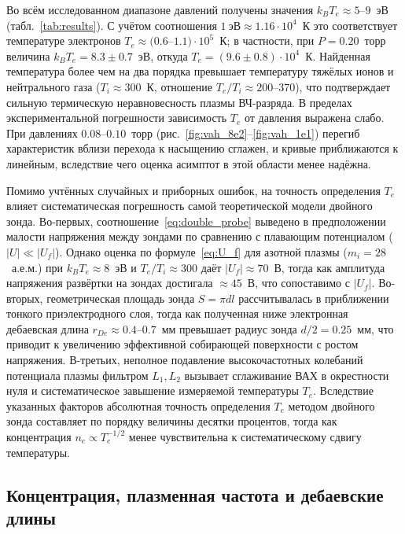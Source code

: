 \documentclass[reprint, amsmath, amssymb, aps, pra, nofootinbib]{revtex4-2}
\begin{document}
Во всём исследованном диапазоне давлений получены значения $k_B T_e \approx 5$--$9$~эВ (табл.~\ref{tab:results}). С учётом соотношения $1~\text{эВ} \approx 1.16\cdot10^4$~К это соответствует температуре электронов $T_e \approx (0.6$--$1.1)\cdot10^5$~К; в частности, при $P = 0.20$~торр величина $k_B T_e = 8.3 \pm 0.7$~эВ, откуда $T_e = (9.6 \pm 0.8)\cdot10^4$~К. Найденная температура более чем на два порядка превышает температуру тяжёлых ионов и нейтрального газа ($T_i \approx 300$~К, отношение $T_e/T_i \approx 200$--$370$), что подтверждает сильную термическую неравновесность плазмы ВЧ-разряда. В пределах экспериментальной погрешности зависимость $T_e$ от давления выражена слабо. При давлениях $0.08$--$0.10$~торр (рис.~\ref{fig:vah_8e2}--\ref{fig:vah_1e1}) перегиб характеристик вблизи перехода к насыщению сглажен, и кривые приближаются к линейным, вследствие чего оценка асимптот в этой области менее надёжна.

Помимо учтённых случайных и приборных ошибок, на точность определения $T_e$ влияет систематическая погрешность самой теоретической модели двойного зонда. Во-первых, соотношение~\eqref{eq:double_probe} выведено в предположении малости напряжения между зондами по сравнению с плавающим потенциалом ($|U| \ll |U_f|$). Однако оценка по формуле~\eqref{eq:U_f} для азотной плазмы ($m_i = 28$~а.е.м.) при $k_B T_e \approx 8$~эВ и $T_e/T_i \approx 300$ даёт $|U_f| \approx 70$~В, тогда как амплитуда напряжения развёртки на зондах достигала $\approx 45$~В, что сопоставимо с $|U_f|$. Во-вторых, геометрическая площадь зонда $S = \pi d l$ рассчитывалась в приближении тонкого приэлектродного слоя, тогда как полученная ниже электронная дебаевская длина $r_{De} \approx 0.4$--$0.7$~мм превышает радиус зонда $d/2 = 0.25$~мм, что приводит к увеличению эффективной собирающей поверхности с ростом напряжения. В-третьих, неполное подавление высокочастотных колебаний потенциала плазмы фильтром $L_1, L_2$ вызывает сглаживание ВАХ в окрестности нуля и систематическое завышение измеряемой температуры $T_e$. Вследствие указанных факторов абсолютная точность определения $T_e$ методом двойного зонда составляет по порядку величины десятки процентов, тогда как концентрация $n_e \propto T_e^{-1/2}$ менее чувствительна к систематическому сдвигу температуры.


\subsection{Концентрация, плазменная частота и дебаевские длины}
\end{document}
